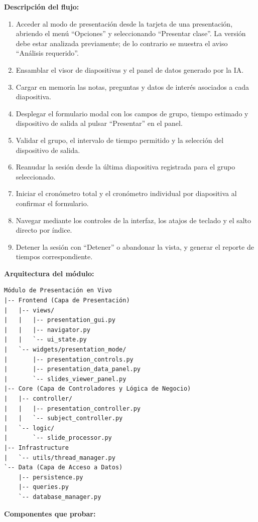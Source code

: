\documentclass[11pt]{article}
\begin{document}
\textbf{Descripción del flujo:}
\begin{enumerate}
    \item Acceder al modo de presentación desde la tarjeta de una presentación, abriendo el menú ``Opciones'' y seleccionando ``Presentar clase''. La versión debe estar analizada previamente; de lo contrario se muestra el aviso ``Análisis requerido''.
    \item Ensamblar el visor de diapositivas y el panel de datos generado por la IA.
    \item Cargar en memoria las notas, preguntas y datos de interés asociados a cada diapositiva.
    \item Desplegar el formulario modal con los campos de grupo, tiempo estimado y dispositivo de salida al pulsar ``Presentar'' en el panel.
    \item Validar el grupo, el intervalo de tiempo permitido y la selección del dispositivo de salida.
    \item Reanudar la sesión desde la última diapositiva registrada para el grupo seleccionado.
    \item Iniciar el cronómetro total y el cronómetro individual por diapositiva al confirmar el formulario.
    \item Navegar mediante los controles de la interfaz, los atajos de teclado y el salto directo por índice.
    \item Detener la sesión con ``Detener'' o abandonar la vista, y generar el reporte de tiempos correspondiente.
\end{enumerate}

\textbf{Arquitectura del módulo:}
\begin{verbatim}
Módulo de Presentación en Vivo
|-- Frontend (Capa de Presentación)
|   |-- views/
|   |   |-- presentation_gui.py
|   |   |-- navigator.py
|   |   `-- ui_state.py
|   `-- widgets/presentation_mode/
|       |-- presentation_controls.py
|       |-- presentation_data_panel.py
|       `-- slides_viewer_panel.py
|-- Core (Capa de Controladores y Lógica de Negocio)
|   |-- controller/
|   |   |-- presentation_controller.py
|   |   `-- subject_controller.py
|   `-- logic/
|       `-- slide_processor.py
|-- Infrastructure
|   `-- utils/thread_manager.py
`-- Data (Capa de Acceso a Datos)
    |-- persistence.py
    |-- queries.py
    `-- database_manager.py
\end{verbatim}

\textbf{Componentes que probar:}
\end{document}
